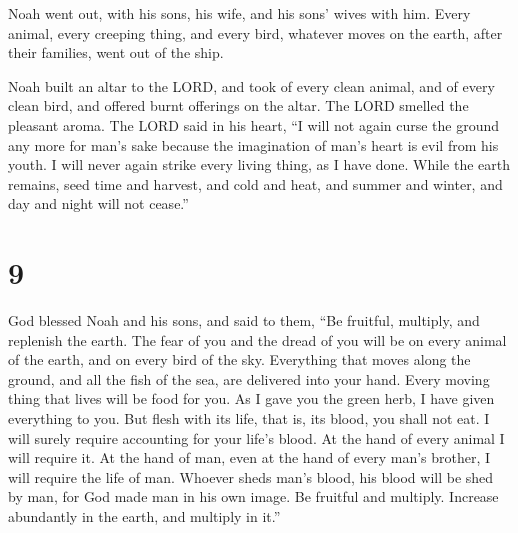  Noah went out, with his sons, his wife, and his sons'
wives with him.  Every animal, every creeping thing, and
every bird, whatever moves on the earth, after their families, went out
of the ship.

 Noah built an altar to the LORD, and took of every clean
animal, and of every clean bird, and offered burnt offerings on the
altar.  The LORD smelled the pleasant aroma. The LORD said
in his heart, ``I will not again curse the ground any more for man's
sake because the imagination of man's heart is evil from his youth. I
will never again strike every living thing, as I have done.
 While the earth remains, seed time and harvest, and cold
and heat, and summer and winter, and day and night will not cease.''

\hypertarget{section-8}{%
\section{9}\label{section-8}}

 God blessed Noah and his sons, and said to them, ``Be
fruitful, multiply, and replenish the earth.  The fear of
you and the dread of you will be on every animal of the earth, and on
every bird of the sky. Everything that moves along the ground, and all
the fish of the sea, are delivered into your hand.  Every
moving thing that lives will be food for you. As I gave you the green
herb, I have given everything to you.  But flesh with its
life, that is, its blood, you shall not eat.  I will surely
require accounting for your life's blood. At the hand of every animal I
will require it. At the hand of man, even at the hand of every man's
brother, I will require the life of man.  Whoever sheds
man's blood, his blood will be shed by man, for God made man in his own
image.  Be fruitful and multiply. Increase abundantly in the
earth, and multiply in it.''

